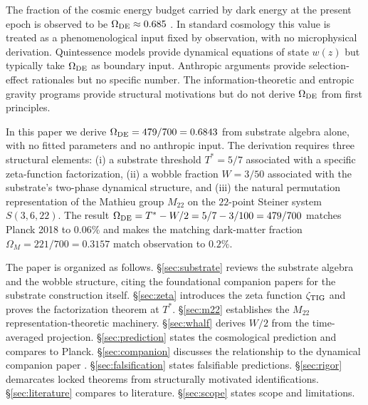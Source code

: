 \documentclass[11pt,reqno]{amsart}
\theoremstyle{plain}
\theoremstyle{definition}
\theoremstyle{remark}
\newcommand{\zTIG}{\zeta_{\rm TIG}}
\newcommand{\Mtwentytwo}{M_{22}}
\newcommand{\Tstar}{T^*}
\newcommand{\Whalf}{W/2}
\newcommand{\OmegaDE}{\Omega_{\rm DE}}
\begin{document}

The fraction of the cosmic energy budget carried by dark energy at the
present epoch is observed to be $\OmegaDE \approx 0.685$
\cite{Planck2020}. In standard cosmology this value is treated as a
phenomenological input fixed by observation, with no microphysical
derivation. Quintessence models provide dynamical equations of state
$w(z)$ but typically take $\OmegaDE$ as boundary input. Anthropic
arguments \cite{Weinberg1989,MartelShapiroWeinberg1998} provide
selection-effect rationales but no specific number. The
information-theoretic and entropic gravity programs
\cite{Verlinde2011} provide structural motivations but do not derive
$\OmegaDE$ from first principles.

In this paper we derive $\OmegaDE = 479/700 = 0.6843$ from substrate
algebra alone, with no fitted parameters and no anthropic input. The
derivation requires three structural elements: (i) a substrate
threshold $\Tstar = 5/7$ associated with a specific zeta-function
factorization, (ii) a wobble fraction $W = 3/50$ associated with the
substrate's two-phase dynamical structure, and (iii) the natural
permutation representation of the Mathieu group $\Mtwentytwo$ on the
$22$-point Steiner system $S(3,6,22)$. The result $\OmegaDE = \Tstar -
\Whalf = 5/7 - 3/100 = 479/700$ matches Planck 2018 to $0.06\%$ and
makes the matching dark-matter fraction $\Omega_M = 221/700 = 0.3157$
match observation to $0.2\%$.


The paper is organized as follows. \S\ref{sec:substrate} reviews the
substrate algebra and the wobble structure, citing the foundational
companion papers \cite{SandersGishSigma,SandersGishFourCore} for the
substrate construction itself. \S\ref{sec:zeta} introduces the zeta
function $\zTIG$ and proves the factorization theorem at $\Tstar$.
\S\ref{sec:m22} establishes the $\Mtwentytwo$ representation-theoretic
machinery. \S\ref{sec:whalf} derives $\Whalf$ from the time-averaged
projection. \S\ref{sec:prediction} states the cosmological prediction
and compares to Planck. \S\ref{sec:companion} discusses the
relationship to the dynamical companion paper
\cite{SandersGishLogQuint2026}. \S\ref{sec:falsification} states
falsifiable predictions. \S\ref{sec:rigor} demarcates locked theorems
from structurally motivated identifications. \S\ref{sec:literature}
compares to literature. \S\ref{sec:scope} states scope and
limitations.
\end{document}
